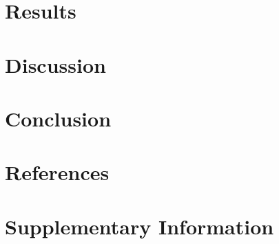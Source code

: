 \documentclass[a4paper,11]{article}
\begin{document}
\newpage
\section{Results}


\newpage
\section{Discussion}


\newpage
\section{Conclusion}


\pagebreak
\section{References}

\pagebreak


\section{Supplementary Information}

\end{document}
